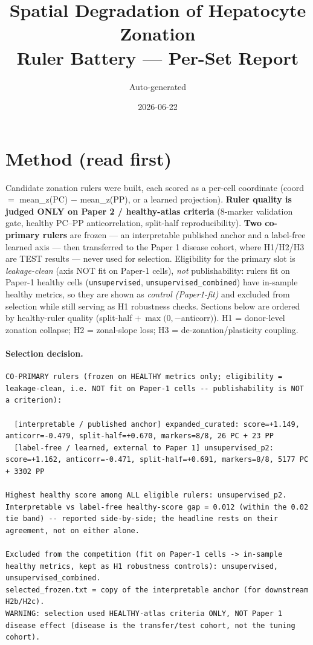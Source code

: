 \documentclass[10pt]{article}
\title{Spatial Degradation of Hepatocyte Zonation\\ Ruler Battery --- Per-Set Report}
\author{Auto-generated}\date{2026-06-22}
\begin{document}
\maketitle
\section*{Method (read first)}
Candidate zonation rulers were built, each scored as a per-cell coordinate
(coord $=$ mean\_z(PC) $-$ mean\_z(PP), or a learned projection). \textbf{Ruler quality is judged
ONLY on Paper 2 / healthy-atlas criteria} (8-marker validation gate, healthy PC--PP
anticorrelation, split-half reproducibility). \textbf{Two co-primary rulers} are frozen --- an
interpretable published anchor and a label-free learned axis --- then transferred to the Paper 1
disease cohort, where H1/H2/H3 are TEST results --- never used for selection. Eligibility for the
primary slot is \emph{leakage-clean} (axis NOT fit on Paper-1 cells), \emph{not} publishability:
rulers fit on Paper-1 healthy cells (\texttt{unsupervised}, \texttt{unsupervised\_combined}) have
in-sample healthy metrics, so they are shown as \emph{control (Paper1-fit)} and excluded from
selection while still serving as H1 robustness checks.
Sections below are ordered by healthy-ruler quality (split-half $+\,\max(0,-$anticorr$)$).
H1 = donor-level zonation collapse; H2 = zonal-slope loss; H3 = de-zonation/plasticity coupling.

\paragraph{Selection decision.}\begin{verbatim}
CO-PRIMARY rulers (frozen on HEALTHY metrics only; eligibility = leakage-clean, i.e. NOT fit on Paper-1 cells -- publishability is NOT a criterion):

  [interpretable / published anchor] expanded_curated: score=+1.149, anticorr=-0.479, split-half=+0.670, markers=8/8, 26 PC + 23 PP
  [label-free / learned, external to Paper 1] unsupervised_p2: score=+1.162, anticorr=-0.471, split-half=+0.691, markers=8/8, 5177 PC + 3302 PP

Highest healthy score among ALL eligible rulers: unsupervised_p2.
Interpretable vs label-free healthy-score gap = 0.012 (within the 0.02 tie band) -- reported side-by-side; the headline rests on their agreement, not on either alone.

Excluded from the competition (fit on Paper-1 cells -> in-sample healthy metrics, kept as H1 robustness controls): unsupervised, unsupervised_combined.
selected_frozen.txt = copy of the interpretable anchor (for downstream H2b/H2c).
WARNING: selection used HEALTHY-atlas criteria ONLY, NOT Paper 1 disease effect (disease is the transfer/test cohort, not the tuning cohort).
\end{verbatim}
\clearpage
\end{document}
